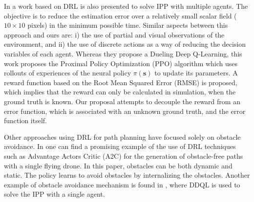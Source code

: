\documentclass[journal]{IEEEtran}
\newcommand\vect[1]{\boldsymbol{#1}}
\begin{document}

In \cite{viseras_deepig_2019} a work based on DRL is also presented to solve IPP with multiple agents. The objective is to reduce the estimation error over a relatively small scalar field ($10 \times 10$ pixels) in the minimum possible time. Similar aspects between this approach and ours are: i) the use of partial and visual observations of the environment, and ii) the use of discrete actions as a way of reducing the decision variables of each agent. Whereas they propose a Dueling Deep Q-Learning, this work proposes the Proximal Policy Optimization (PPO) algorithm which uses rollouts of experiences of the neural policy $\pi(\vect{s})$ to update its parameters. A reward function based on the Root Mean Squared Error (RMSE) is proposed, which implies that the reward can only be calculated in simulation, when the ground truth is known. Our proposal attempts to decouple the reward from an error function, which is associated with an unknown ground truth, and the error function itself. 


Other approaches using DRL for path planning have focused solely on obstacle avoidance. In \cite{zhang_autonomous_2022} one can find a promising example of the use of DRL techniques such as Advantage Actors Critic (A2C) for the generation of obstacle-free paths with a single flying drone. In this paper, obstacles can be both dynamic and static. The policy learns to avoid obstacles by internalizing the obstacles. Another example of obstacle avoidance mechanism is found in \cite{censoring_yanes_2022}, where DDQL is used to solve the IPP with a single agent.

\end{document}
